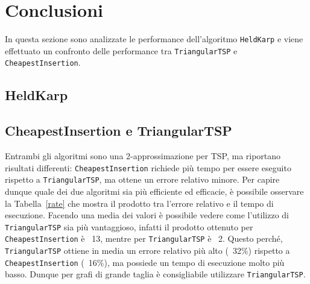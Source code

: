 \section{Conclusioni}
In questa sezione sono analizzate le performance dell'algoritmo \texttt{HeldKarp} e viene effettuato un confronto delle performance tra \texttt{TriangularTSP} e \texttt{CheapestInsertion}.

\subsection{HeldKarp}

\subsection{CheapestInsertion e TriangularTSP}
Entrambi gli algoritmi sono una 2-approssimazione per TSP, ma riportano risultati differenti: \texttt{CheapestInsertion} richiede più tempo per essere eseguito rispetto a \texttt{TriangularTSP}, ma ottene un errore relativo minore. Per capire dunque quale dei due algoritmi sia più efficiente ed efficacie, è possibile osservare la Tabella~\ref{rate} che mostra il prodotto tra l'errore relativo e il tempo di esecuzione. Facendo una media dei valori è possibile vedere come l'utilizzo di \texttt{TriangularTSP} sia più vantaggioso, infatti il prodotto ottenuto per \texttt{CheapestInsertion} è ~13, mentre per \texttt{TriangularTSP} è ~2. Questo perché, \texttt{TriangularTSP} ottiene in media un errore relativo più alto (~32\%) rispetto a \texttt{CheapestInsertion} (~16\%), ma possiede un tempo di esecuzione molto più basso. Dunque per grafi di grande taglia è consigliabile utilizzare \texttt{TriangularTSP}.

